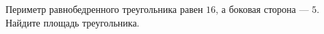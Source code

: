 \begin{ex}
	\begin{condition}
		Периметр равнобедренного треугольника равен \( 16 \), а боковая сторона --- \( 5 \). Найдите площадь треугольника.
	\end{condition}
\end{ex}